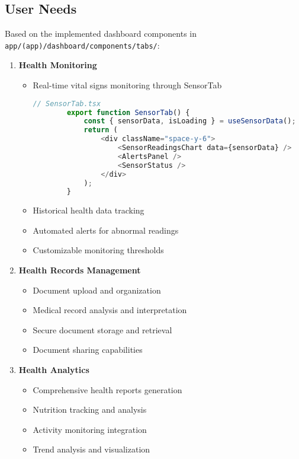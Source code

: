 \subsection{User Needs}
Based on the implemented dashboard components in \texttt{app/(app)/dashboard/components/tabs/}:

\begin{enumerate}
    \item \textbf{Health Monitoring}
    \begin{itemize}
        \item Real-time vital signs monitoring through SensorTab
        \begin{lstlisting}[language=typescript]
        // SensorTab.tsx
        export function SensorTab() {
            const { sensorData, isLoading } = useSensorData();
            return (
                <div className="space-y-6">
                    <SensorReadingsChart data={sensorData} />
                    <AlertsPanel />
                    <SensorStatus />
                </div>
            );
        }
        \end{lstlisting}
        \item Historical health data tracking
        \item Automated alerts for abnormal readings
        \item Customizable monitoring thresholds
    \end{itemize}

    \item \textbf{Health Records Management}
    \begin{itemize}
        \item Document upload and organization
        \item Medical record analysis and interpretation
        \item Secure document storage and retrieval
        \item Document sharing capabilities
    \end{itemize}

    \item \textbf{Health Analytics}
    \begin{itemize}
        \item Comprehensive health reports generation
        \item Nutrition tracking and analysis
        \item Activity monitoring integration
        \item Trend analysis and visualization
    \end{itemize}
\end{enumerate} 